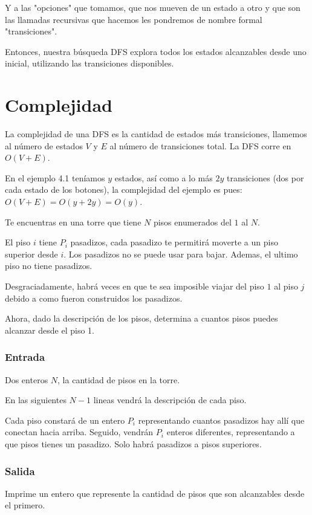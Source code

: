 Y a las "opciones" que tomamos, que nos mueven de un estado a otro y que son las llamadas recursivas que hacemos les pondremos de nombre formal "transiciones".

Entonces, nuestra búsqueda DFS explora todos los estados alcanzables desde uno inicial, utilizando las transiciones disponibles.
\section*{Complejidad}
La complejidad de una DFS es la cantidad de estados más transiciones, llamemos al número de estados \(V\) y \(E\) al número de transiciones total. La DFS corre en \(O(V+E)\).

En el ejemplo 4.1 teníamos \(y\) estados, así como a lo más \(2y\) transiciones (dos por cada estado de los botones), la complejidad del ejemplo es pues: \(O(V+E)=O(y+2y)=O(y)\).



\newpage


\problembreak

\problemtitle Te encuentras en una torre que tiene \(N\) pisos enumerados del \(1\) al \(N\).

El piso \(i\) tiene \(P_i\) pasadizos, cada pasadizo te permitirá moverte a un piso superior desde \(i\). Los pasadizos no se puede usar para bajar.
Ademas, el ultimo piso no tiene pasadizos.

Desgraciadamente, habrá veces en que te sea imposible viajar del piso \(1\) al piso \(j\) debido a como fueron construidos los pasadizos.

Ahora, dado la descripción de los pisos, determina a cuantos pisos puedes alcanzar desde el piso 1.
\subsubsection*{Entrada}
Dos enteros \(N\), la cantidad de pisos en la torre.

En las siguientes \(N-1\) lineas vendrá la descripción de cada piso. 

Cada piso constará de un entero \(P_i\) representando cuantos pasadizos hay allí que conectan hacia arriba. Seguido, vendrán \(P_i\) enteros diferentes, representando a que pisos tienes un pasadizo. Solo habrá pasadizos a pisos superiores.

\subsubsection*{Salida}
Imprime un entero que represente la cantidad de pisos que son alcanzables desde el primero.

